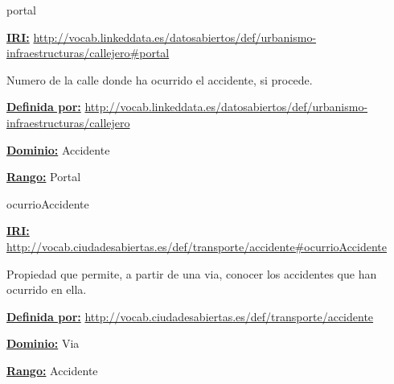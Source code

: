 \begin{mybox}{portal}
\begin{flushleft}
\underline{\textbf{IRI:}}
\url{http://vocab.linkeddata.es/datosabiertos/def/urbanismo-infraestructuras/callejero#portal}
\newline

Numero de la calle donde ha ocurrido el accidente, si procede.
\newline

\underline{\textbf{Definida por:}}\newline
\url{http://vocab.linkeddata.es/datosabiertos/def/urbanismo-infraestructuras/callejero}
\newline

\underline{\textbf{Dominio:}} Accidente
\newline

\underline{\textbf{Rango:}} Portal
\newline

\end{flushleft}
\end{mybox}








\begin{mybox}{ocurrioAccidente}
\begin{flushleft}
\underline{\textbf{IRI:}}
\url{http://vocab.ciudadesabiertas.es/def/transporte/accidente#ocurrioAccidente}
\newline

Propiedad que permite, a partir de una via, conocer los accidentes que han ocurrido en ella.

\underline{\textbf{Definida por:}}\newline
\url{http://vocab.ciudadesabiertas.es/def/transporte/accidente}
\newline

\underline{\textbf{Dominio:}} Via
\newline

\underline{\textbf{Rango:}} Accidente
\newline

\end{flushleft}
\end{mybox}




